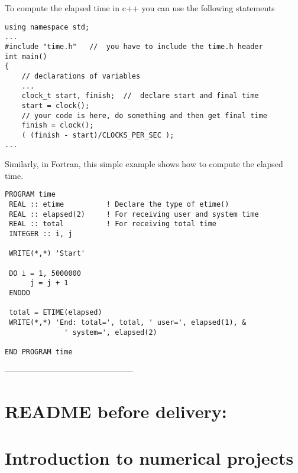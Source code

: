 \documentclass[11pt,a4wide]{article}
\begin{document}
\begin{enumerate}
To compute the elapsed time in c++ you can use the following statements
\begin{lstlisting}[title={Time in C++}]
using namespace std;
...
#include "time.h"   //  you have to include the time.h header
int main()
{
    // declarations of variables 
    ...
    clock_t start, finish;  //  declare start and final time
    start = clock();
    // your code is here, do something and then get final time
    finish = clock();
    ( (finish - start)/CLOCKS_PER_SEC );
...
\end{lstlisting}
Similarly, in Fortran, this simple example shows how to compute the elapsed time.
\lstset{language=[90]Fortran}
\begin{lstlisting}[title={Time in Fortran}]
PROGRAM time
 REAL :: etime          ! Declare the type of etime()
 REAL :: elapsed(2)     ! For receiving user and system time
 REAL :: total          ! For receiving total time
 INTEGER :: i, j

 WRITE(*,*) 'Start'

 DO i = 1, 5000000  
      j = j + 1
 ENDDO

 total = ETIME(elapsed)
 WRITE(*,*) 'End: total=', total, ' user=', elapsed(1), &
              ' system=', elapsed(2)

END PROGRAM time
\end{lstlisting}

\end{enumerate}

-----------------------------------------------

\newpage
\section*{ README before delivery:}

\section*{Introduction to numerical projects}
\end{document}
